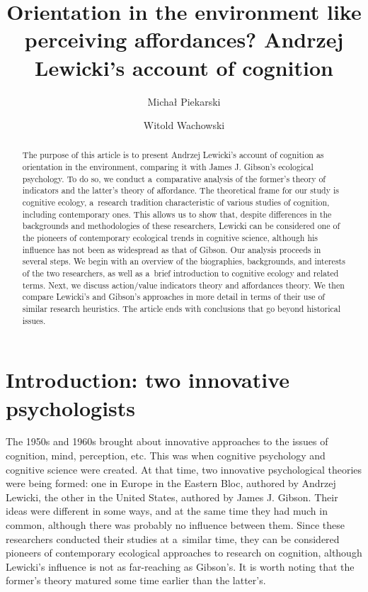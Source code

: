 \documentclass[%
manuscript=article,
year=2024,
volume=77,
doi=10.59203/zfn.77.693,
]{zfn}
\title[Orientation in the environment like perceiving affordances?\ldots]{Orientation in the environment like perceiving affordances? Andrzej Lewicki's account of cognition}
\author{Michał Piekarski}
\affiliation{Cardinal Stefan Wyszyński University in Warsaw}
\author{Witold Wachowski}
\affiliation{Maria Curie-Skłodowska University in Lublin}
\begin{document}
	
	\begin{abstract}
		The purpose of this article is to present Andrzej Lewicki's account of cognition as orientation in the environment, comparing it with James J. Gibson's ecological psychology. To do so, we conduct a~comparative analysis of the former's theory of indicators and the latter's theory of affordance. The theoretical frame for our study is cognitive ecology, a~research tradition characteristic of various studies of cognition, including contemporary ones. This allows us to show that, despite differences in the backgrounds and methodologies of these researchers, Lewicki can be considered one of the pioneers of contemporary ecological trends in cognitive science, although his influence has not been as widespread as that of Gibson. Our analysis proceeds in several steps. We begin with an overview of the biographies, backgrounds, and interests of the two researchers, as well as a~brief introduction to cognitive ecology and related terms. Next, we discuss action/value indicators theory and affordances theory. We then compare Lewicki's and Gibson's approaches in more detail in terms of their use of similar research heuristics. The article ends with conclusions that go beyond historical issues.
	\end{abstract}
	
	











\section{Introduction: two innovative psychologists}

The 1950s and 1960s brought about innovative approaches to the issues of cognition, mind, perception, etc. This was when cognitive psychology and cognitive science were created. At that time, two innovative psychological theories were being formed: one in Europe in the Eastern Bloc, authored by Andrzej Lewicki, the other in the United States, authored by James J. Gibson. Their ideas were different in some ways, and at the same time they had much in common, although there was probably no influence between them. Since these researchers conducted their studies at a~similar time, they can be considered pioneers of contemporary ecological approaches to research on cognition, although Lewicki's influence is not as far-reaching as Gibson's. It is worth noting that the former's theory matured some time earlier than the latter's.
\end{document}
